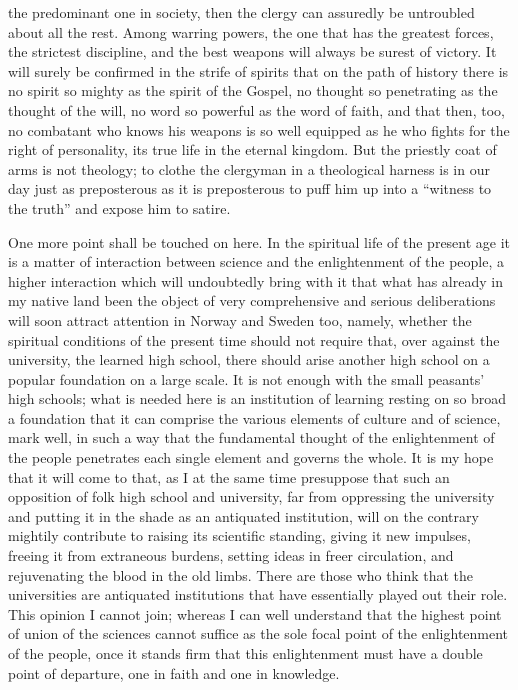 \documentclass[12pt]{book}
\newcommand{\opage}[1]{\marginnote{\footnotesize\textit{[#1]}}}
\begin{document}
the predominant one in society, then the clergy can assuredly be
untroubled about all the rest. Among warring powers, the one that has the
greatest forces, the strictest discipline, and the best weapons will
always be surest of victory. It will surely be confirmed in the strife of
spirits that on the path of history there is no spirit so mighty as the
spirit of the Gospel, no thought so penetrating as the thought of the
will, no word so powerful as the word of faith, and that then, too, no
combatant who knows his weapons is so well equipped as he who fights for
the right of personality, its true life in the eternal kingdom. But the
priestly coat of arms is not theology; to clothe the clergyman in a
theological harness is in our day just as preposterous as it is
preposterous to puff him up into a ``witness to the truth'' and expose
him to satire.

One more point shall be touched on here. In the spiritual life of the
present age it is a matter of interaction between science and the
enlightenment of the people, a higher interaction which will undoubtedly
bring with it that what has already in my native land been the object of
very comprehensive and serious deliberations will soon attract attention
in Norway and Sweden too, namely, whether the spiritual conditions of the
present time should not require that, over against the university, the
learned high school, there should arise another high school on a
popular foundation on a large scale. It is not enough with the small
peasants' high schools; what is needed here is an institution of learning
resting on so broad a foundation that it can comprise the various
elements of culture and of science, mark well, in such a way that the
fundamental thought of the enlightenment of the people
\opage{293}\setcounter{footnote}{0}%
penetrates each single element and governs the whole. It is my hope that
it will come to that, as I at the same time presuppose that such an
opposition of folk high school and university, far from oppressing the
university and putting it in the shade as an antiquated institution,
will on the contrary mightily contribute to raising its scientific
standing, giving it new impulses, freeing it from extraneous burdens,
setting ideas in freer circulation, and rejuvenating the blood in the old
limbs. There are those who think that the universities are antiquated
institutions that have essentially played out their role. This opinion I
cannot join; whereas I can well understand that the highest point of
union of the sciences cannot suffice as the sole focal point of the
enlightenment of the people, once it stands firm that this enlightenment
must have a double point of departure, one in faith and one in knowledge.
\end{document}
